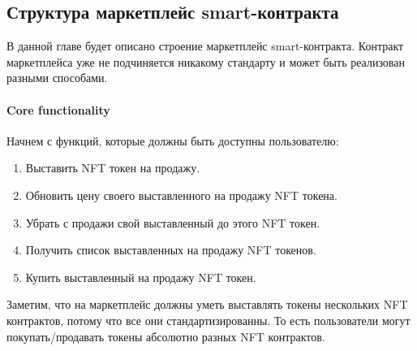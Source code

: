

\subsection{Структура маркетплейс smart-контракта}

В данной главе будет описано строение маркетплейс smart-контракта. Контракт маркетплейса уже не подчиняется никакому стандарту и может быть реализован разными способами.

\paragraph{Core functionality}

Начнем с функций, которые должны быть доступны пользователю:
\begin{enumerate}
    \item Выставить NFT токен на продажу.
    \item Обновить цену своего выставленного на продажу NFT токена.
    \item Убрать с продажи свой выставленный до этого NFT токен.
    \item Получить список выставленных на продажу NFT токенов.
    \item Купить выставленный на продажу NFT токен.
\end{enumerate}

Заметим, что на маркетплейс должны уметь выставлять токены нескольких NFT контрактов, потому что все они стандартизированны.
То есть пользователи могут покупать/продавать токены абсолютно разных NFT контрактов.

